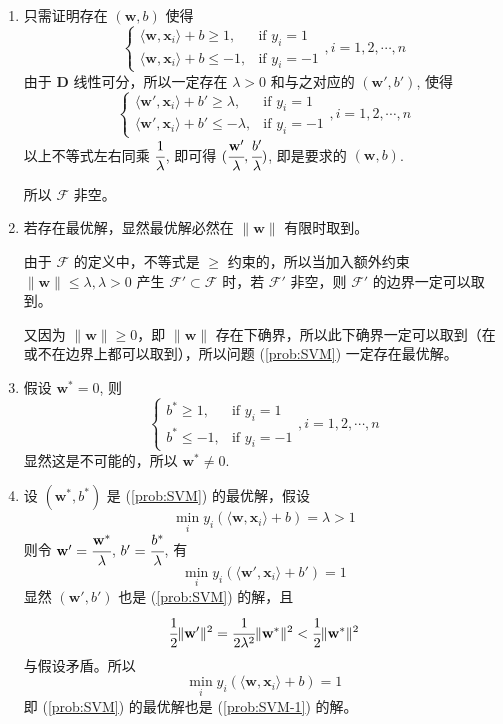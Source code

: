 \documentclass[11pt,letter,notitlepage]{article}
\begin{document}
\begin{solution}
	\begin{enumerate}
		\item %
		      只需证明存在 $(\mathbf{w},b)$ 使得
		      $$\begin{cases}
				      \langle \mathbf{w},\mathbf{x}_i \rangle + b \geq 1 ,  & \text{if $y_i=1$}  \\
				      \langle \mathbf{w},\mathbf{x}_i \rangle + b \leq -1 , & \text{if $y_i=-1$}
			      \end{cases}, i=1,2,\cdots,n$$
		      由于 $\mathbf{D}$ 线性可分，所以一定存在 $\lambda>0$ 和与之对应的 $(\mathbf{w}',b')$, 使得
		      $$\begin{cases}
				      \langle \mathbf{w}',\mathbf{x}_i \rangle + b' \geq \lambda ,  & \text{if $y_i=1$}  \\
				      \langle \mathbf{w}',\mathbf{x}_i \rangle + b' \leq -\lambda , & \text{if $y_i=-1$}
			      \end{cases}, i=1,2,\cdots,n$$
		      以上不等式左右同乘 $\cfrac{1}{\lambda}$, 即可得 $(\cfrac{\mathbf{w}'}{\lambda},\cfrac{b'}{\lambda})$, 即是要求的 $(\mathbf{w},b)$.

		      所以 $\mathcal{F}$ 非空。

		\item %
		      若存在最优解，显然最优解必然在 $\|\mathbf{w}\|$ 有限时取到。

		      由于 $\mathcal{F}$ 的定义中，不等式是 $\geq$ 约束的，所以当加入额外约束 $\|\mathbf{w}\|\leq\lambda, \lambda>0$ 产生 $\mathcal{F}'\subset\mathcal{F}$ 时，若 $\mathcal{F}'$ 非空，则 $\mathcal{F}'$ 的边界一定可以取到。

		      又因为 $\|\mathbf{w}\| \geq 0$，即 $\|\mathbf{w}\|$ 存在下确界，所以此下确界一定可以取到（在或不在边界上都可以取到），所以问题 (\ref{prob:SVM}) 一定存在最优解。

		\item 假设 $\mathbf{w}^*=0$, 则
		      $$\begin{cases}
				      b^* \geq 1 ,  & \text{if $y_i=1$}  \\
				      b^* \leq -1 , & \text{if $y_i=-1$}
			      \end{cases}, i=1,2,\cdots,n$$
		      显然这是不可能的，所以 $\mathbf{w}^*\neq 0$.
		\item 设 $(\mathbf{w}^*,b^*)$ 是 (\ref{prob:SVM}) 的最优解，假设
		      $$\min_i y_i (\langle \mathbf{w}, \mathbf{x}_i \rangle +b) = \lambda >1$$
		      则令 $\mathbf{w}'=\cfrac{\mathbf{w}^*}{\lambda}$, $b'=\cfrac{b^*}{\lambda}$, 有
		      $$\min_i y_i (\langle \mathbf{w}', \mathbf{x}_i \rangle +b') =1$$
		      显然 $(\mathbf{w}',b')$ 也是 (\ref{prob:SVM}) 的解，且
		      $$\cfrac{1}{2}\|\mathbf{w}'\|^2=\cfrac{1}{2\lambda^2}\|\mathbf{w}^*\|^2
			      < \cfrac{1}{2}\|\mathbf{w}^*\|^2$$
		      与假设矛盾。所以
		      $$\min_i y_i (\langle \mathbf{w}, \mathbf{x}_i \rangle +b) = 1$$
		      即 (\ref{prob:SVM}) 的最优解也是 (\ref{prob:SVM-1}) 的解。


\end{enumerate}
\end{solution}
\end{document}
